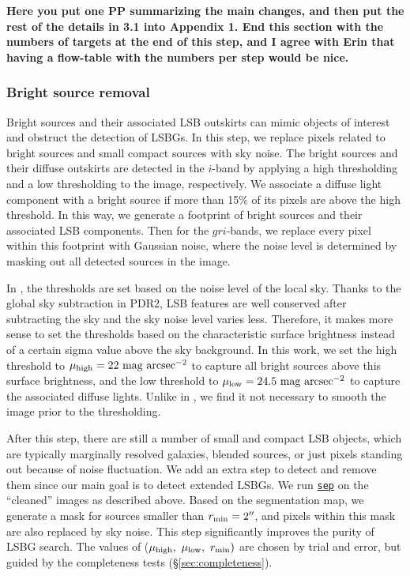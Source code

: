 \documentclass[twocolumn,astrosymb,twocolappendix]{aastex631}
\newcommand{\sbunit}{\mathrm{mag\ arcsec}^{-2}}
\newcommand{\code}[1]{\texttt{#1}}
\begin{document}
\begin{CJK*}{UTF8}{gbsn}
{\bf Here you put one PP summarizing the main changes, and then put the rest of the details in 3.1 into Appendix 1. End this section with the numbers of targets at the end of this step, and I agree with Erin that having a flow-table with the numbers per step would be nice.}

\subsubsection{Bright source removal}
Bright sources and their associated LSB outskirts can mimic objects of interest and obstruct the detection of LSBGs. In this step, we replace pixels related to bright sources and small compact sources with sky noise. The bright sources and their diffuse outskirts are detected in the $i$-band by applying a high thresholding and a low thresholding to the image, respectively. We associate a diffuse light component with a bright source if more than 15\% of its pixels are above the high threshold. In this way, we generate a footprint of bright sources and their associated LSB components. Then for the $gri$-bands, we replace every pixel within this footprint with Gaussian noise, where the noise level is determined by masking out all detected sources in the image. 
    
    In , the thresholds are set based on the noise level of the local sky. Thanks to the global sky subtraction in PDR2, LSB features are well conserved after subtracting the sky and the sky noise level varies less. Therefore, it makes more sense to set the thresholds based on the characteristic surface brightness instead of a certain sigma value above the sky background. In this work, we set the high threshold to $\mu_{\rm high} = 22\ \sbunit$ to capture all bright sources above this surface brightness, and the low threshold to $\mu_{\rm low} = 24.5\ \sbunit$ to capture the associated diffuse lights. Unlike in , we find it not necessary to smooth the image prior to the thresholding. 
    
    After this step, there are still a number of small and compact LSB objects, which are typically marginally resolved galaxies, blended sources, or just pixels standing out because of noise fluctuation. We add an extra step to detect and remove them since our main goal is to detect extended LSBGs. We run \href{https://sep.readthedocs.io/en/v1.1.x}{\code{sep}} \citep{Barbary2016} on the ``cleaned'' images as described above. Based on the segmentation map, we generate a mask for sources smaller than $r_{\rm min} = 2\mbox{$^{\prime\prime}$}$, and pixels within this mask are also replaced by sky noise. This step significantly improves the purity of LSBG search. The values of ($\mu_{\rm high},\ \mu_{\rm low},\ r_{\rm min})$ are chosen by trial and error, but guided by the completeness tests (\S \ref{sec:completeness}). 
    

\end{CJK*}
\end{document}
